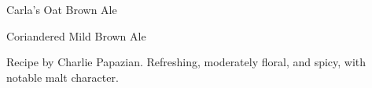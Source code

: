 \begin{recipe}{Carla's Oat Brown Ale}
\begin{ingredientsblock}

\end{ingredientsblock}

\begin{recipe}{Coriandered Mild Brown Ale}

\begin{aboutblock}
Recipe by Charlie Papazian. Refreshing, moderately floral, and spicy, with notable
malt character. 
\end{aboutblock}


\begin{methodandtiming}

\begin{mashsteps}
\end{mashsteps}

\begin{fermentationsteps}
\end{fermentationsteps}

\end{methodandtiming}

\recipebreak

\begin{ingredientsblock}

\begin{malts}
\end{malts}

\begin{hops}
\end{hops}


\begin{twists}
\end{twists}


\end{ingredientsblock}
\end{recipe}
\end{recipe}
